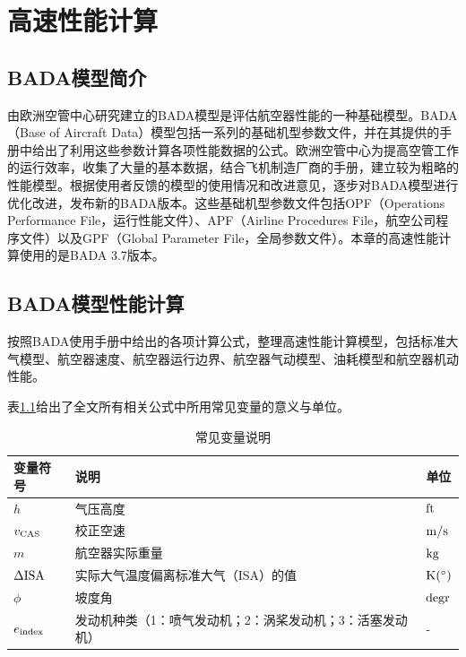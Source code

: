 \documentclass[a4paper,punct,space,heading=true,AutoFakeBold]{ctexrep}
\begin{document}
\chapter{高速性能计算}\label{highspeedperformance}

\section{BADA模型简介}

由欧洲空管中心研究建立的BADA模型是评估航空器性能的一种基础模型\cite{BADA}。BADA（Base of Aircraft Data）模型包括一系列的基础机型参数文件，并在其提供的手册中给出了利用这些参数计算各项性能数据的公式。欧洲空管中心为提高空管工作的运行效率，收集了大量的基本数据，结合飞机制造厂商的手册，建立较为粗略的性能模型。根据使用者反馈的模型的使用情况和改进意见，逐步对BADA模型进行优化改进，发布新的BADA版本。这些基础机型参数文件包括OPF（Operations Performance File，运行性能文件）、APF（Airline Procedures File，航空公司程序文件）以及GPF（Global Parameter File，全局参数文件）。本章的高速性能计算使用的是BADA 3.7版本。

\section{BADA模型性能计算}\label{BADAModel}

按照BADA使用手册中给出的各项计算公式，整理高速性能计算模型，包括标准大气模型、航空器速度、航空器运行边界、航空器气动模型、油耗模型和航空器机动性能。

表\ref{commonparameters}给出了全文所有相关公式中所用常见变量的意义与单位。

\begin{table}[!ht]
	\caption{常见变量说明}\label{commonparameters}
	\begin{tabular*}{\hsize}{@{}@{\extracolsep{\fill}}lll@{}}
		\toprule[1.5pt]
		变量符号  &说明  &单位\\
		\midrule[0.5pt]
		$h$  &气压高度   &$\rm ft$\\
		$v_{\rm CAS}$  &校正空速  &$\rm m/s$\\
		$m$  &航空器实际重量 &$\rm kg$\\
		$\Delta \rm ISA$  &实际大气温度偏离标准大气（ISA）的值  &$\rm K(^\circ)$\\
		$\phi$  &坡度角  &$\rm degr$\\
		$e_{\rm index}$  &发动机种类（1：喷气发动机；2：涡桨发动机；3：活塞发动机）  &-\\
		\bottomrule[1.5pt]
	\end{tabular*}
\end{table}
\end{document}
